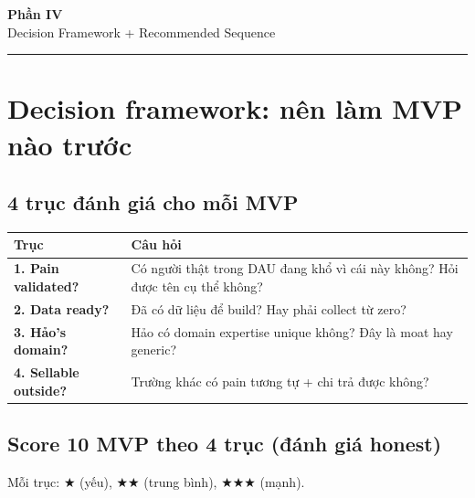 \documentclass[11pt,a4paper]{article}
\begin{document}
\begin{center}
\vspace*{0.5em}
{\sffamily\bfseries\Huge\color{ink} Phần IV}\\[0.5em]
{\sffamily\LARGE\color{mid} Decision Framework + Recommended Sequence}\\[0.5em]
{\color{ink}\rule{6cm}{0.4pt}}
\end{center}
\vspace{1em}

\section{Decision framework: nên làm MVP nào trước}

\subsection{4 trục đánh giá cho mỗi MVP}

\begin{tabularx}{\linewidth}{@{}p{3.5cm} X@{}}
\toprule
\textbf{Trục} & \textbf{Câu hỏi} \\
\midrule
\textbf{1. Pain validated?} & Có người thật trong DAU đang khổ vì cái này không? Hỏi được tên cụ thể không? \\
\textbf{2. Data ready?} & Đã có dữ liệu để build? Hay phải collect từ zero? \\
\textbf{3. Hảo's domain?} & Hảo có domain expertise unique không? Đây là moat hay generic? \\
\textbf{4. Sellable outside?} & Trường khác có pain tương tự + chi trả được không? \\
\bottomrule
\end{tabularx}

\subsection{Score 10 MVP theo 4 trục (đánh giá honest)}

Mỗi trục: ★ (yếu), ★★ (trung bình), ★★★ (mạnh).
\end{document}
